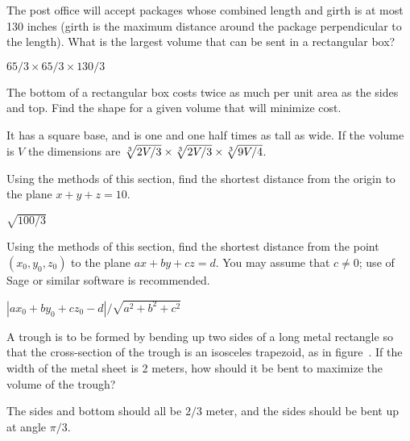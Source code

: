 \begin{exercises}
\begin{exercise} The post office will accept packages whose combined length
and girth is at most 130 inches (girth is the maximum distance around
the package perpendicular to the length). What is the largest volume
that can be sent in a rectangular box?
\begin{answer} $65/3\times 65/3\times 130/3$
\end{answer}\end{exercise}

\begin{exercise} The bottom of a rectangular box costs twice as much per unit
area as the sides and top. Find the shape for a given volume that will
minimize cost.
\begin{answer} It has a square base, and is one and one half times as tall as wide.
If the volume is $V$ the dimensions are $\root 3 \of {2V/3}\times
\root 3 \of {2V/3}\times \root 3\of {9V/4}$.
\end{answer}\end{exercise}

\begin{exercise} Using the methods of this section, find the shortest
distance from the origin to the plane $x+y+z=10$.
\begin{answer} $\sqrt{100/3}$
\end{answer}\end{exercise}

\begin{exercise} Using the methods of this section, find the shortest
distance from the point $(x_0,y_0,z_0)$ to the plane $ax+by+cz=d$.
You may assume that $c\not=0$; use of Sage or similar software
is recommended.
\begin{answer} $|ax_0+by_0+cz_0-d|/\sqrt{a^2+b^2+c^2}$
\end{answer}\end{exercise}

\begin{exercise} A trough is to be formed by bending up two sides of a long
metal rectangle
so that the cross-section of the trough is an isosceles trapezoid, as
in figure~. If the width of the metal sheet is 2
meters, how should it be bent to maximize the volume of the trough?
\begin{answer} The sides and bottom should all be $2/3$ meter, and the sides
should be bent up at angle $\pi/3$.
\end{answer}\end{exercise}


\end{exercises}
